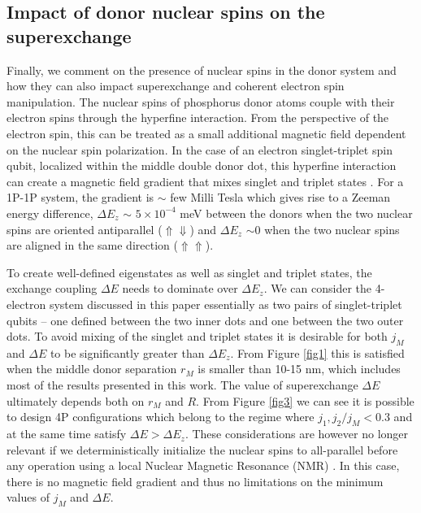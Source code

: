 \documentclass[%
showkeys,
 amsmath,amssymb,
 aps,
prb,
]{revtex4-2}
\begin{document}
\subsection{Impact of donor nuclear spins on the superexchange}
Finally, we comment on the presence of nuclear spins in the donor system and how they can also impact superexchange and coherent electron spin manipulation. The nuclear spins of phosphorus donor atoms couple with their electron spins through the hyperfine interaction. From the perspective of the electron spin, this can be treated as a small additional magnetic field dependent on the nuclear spin polarization. In the case of an electron singlet-triplet spin qubit, localized within the middle double donor dot, this hyperfine interaction can create a magnetic field gradient that mixes singlet and triplet states \cite{Osika2022,Kranz2022}. For a 1P-1P system, the gradient is $\sim$ few Milli Tesla which gives rise to a Zeeman energy difference, $\Delta E_z$ $\sim$ $5\times10^{-4}$ meV between the donors when the two nuclear spins are oriented antiparallel ($\Uparrow \Downarrow$) and $\Delta E_z$ $\sim 0$ when the two nuclear spins are aligned in the same direction ($\Uparrow \Uparrow$). 

To create well-defined eigenstates as well as singlet and triplet states, the exchange coupling $\Delta E$ needs to dominate over $\Delta E_z$. We can consider the 4-electron system discussed in this paper essentially as two pairs of singlet-triplet qubits -- one defined between the two inner dots and one between the two outer dots. To avoid mixing of the singlet and triplet states it is desirable for both $j_M$ and $\Delta E$ to be significantly greater than $\Delta E_z$. From Figure \ref{fig1} this is satisfied when the middle donor separation $r_M$ is smaller than 10-15 nm, which includes most of the results presented in this work. The value of superexchange $\Delta E$ ultimately depends both on $r_M$ and $R$. From Figure \ref{fig3} we can see it is possible to design 4P configurations which belong to the regime where $j_1,j_2/j_M < 0.3$ and at the same time satisfy $\Delta E > \Delta E_z$. These considerations are however no longer relevant if we deterministically initialize the nuclear spins to all-parallel before any operation using a local  Nuclear Magnetic Resonance (NMR) \cite{plaSingleatomElectronSpin2012}. In this case, there is no magnetic field gradient and thus no limitations on the minimum values of $j_M$ and $\Delta E$.
\end{document}
